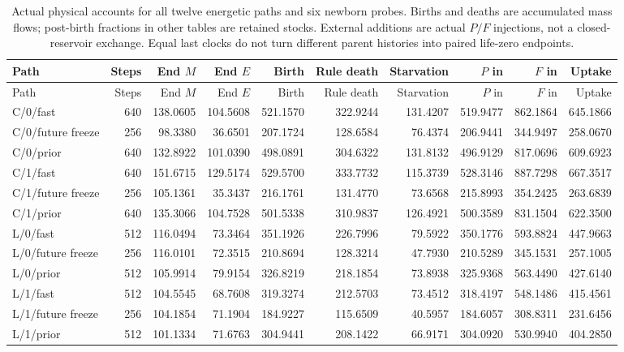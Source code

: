 \begin{longtable}{lrrrrrrrrr}
\caption{Actual physical accounts for all twelve energetic paths and six newborn probes. Births and deaths are accumulated mass flows; post-birth fractions in other tables are retained stocks. External additions are actual $P/F$ injections, not a closed-reservoir exchange. Equal last clocks do not turn different parent histories into paired life-zero endpoints.}\label{tab:young-flows}\\
\toprule
Path & Steps & End $M$ & End $E$ & Birth & Rule death & Starvation & $P$ in & $F$ in & Uptake \\
\midrule\endfirsthead
\toprule
Path & Steps & End $M$ & End $E$ & Birth & Rule death & Starvation & $P$ in & $F$ in & Uptake \\
\midrule\endhead
C/0/fast & 640 & 138.0605 & 104.5608 & 521.1570 & 322.9244 & 131.4207 & 519.9477 & 862.1864 & 645.1866 \\
C/0/future freeze & 256 & 98.3380 & 36.6501 & 207.1724 & 128.6584 & 76.4374 & 206.9441 & 344.9497 & 258.0670 \\
C/0/prior & 640 & 132.8922 & 101.0390 & 498.0891 & 304.6322 & 131.8132 & 496.9129 & 817.0696 & 609.6923 \\
C/1/fast & 640 & 151.6715 & 129.5174 & 529.5700 & 333.7732 & 115.3739 & 528.3146 & 887.7298 & 667.3517 \\
C/1/future freeze & 256 & 105.1361 & 35.3437 & 216.1761 & 131.4770 & 73.6568 & 215.8993 & 354.2425 & 263.6839 \\
C/1/prior & 640 & 135.3066 & 104.7528 & 501.5338 & 310.9837 & 126.4921 & 500.3589 & 831.1504 & 622.3500 \\
L/0/fast & 512 & 116.0494 & 73.3464 & 351.1926 & 226.7996 & 79.5922 & 350.1776 & 593.8824 & 447.9663 \\
L/0/future freeze & 256 & 116.0101 & 72.3515 & 210.8694 & 128.3214 & 47.7930 & 210.5289 & 345.1531 & 257.1005 \\
L/0/prior & 512 & 105.9914 & 79.9154 & 326.8219 & 218.1854 & 73.8938 & 325.9368 & 563.4490 & 427.6140 \\
L/1/fast & 512 & 104.5545 & 68.7608 & 319.3274 & 212.5703 & 73.4512 & 318.4197 & 548.1486 & 415.4561 \\
L/1/future freeze & 256 & 104.1854 & 71.1904 & 184.9227 & 115.6509 & 40.5957 & 184.6057 & 308.8311 & 231.6456 \\
L/1/prior & 512 & 101.1334 & 71.6763 & 304.9441 & 208.1422 & 66.9171 & 304.0920 & 530.9940 & 404.2850 \\

\end{longtable}
